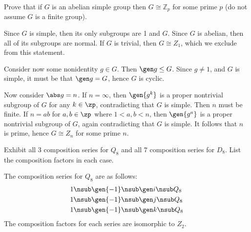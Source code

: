 \begin{problems}

    \item Prove that if $G$ is an abelian simple group then $G \cong \mathbb{Z}_p$ for some prime $p$ (do not assume $G$ is a finite group).
    \begin{sol}
        Since $G$ is simple, then its only subgroups are 1 and $G$. Since $G$ is abelian, then all of its subgroups are normal. If $G$ is trivial, then $G \cong Z_1$, which we exclude from this statement.
        
        Consider now some nonidentity $g \in G$. Then $\gen g \leq G$. Since $g \neq 1$, and $G$ is simple, it must be that $\gen g = G$, hence $G$ is cyclic.

        Now consider $\abs g = n$. If $n = \infty$, then $\gen{g^k}$ is a proper nontrivial subgroup of $G$ for any $k \in \zp$, contradicting that $G$ is simple. Then $n$ must be finite. If $n = ab$ for $a, b \in \zp$ where $1 < a, b < n$, then $\gen{g^a}$ is a proper nontrivial subgroup of $G$, again contradicting that $G$ is simple. It follows that $n$ is prime, hence $G \cong Z_n$ for some prime $n$.
    \end{sol}
    \item Exhibit all $3$ composition series for $Q_8$ and all $7$ composition series for $D_8$. List the composition factors in each case.
    \begin{sol}
        The composition series for $Q_8$ are as follows:
        \begin{align*}
            1 & \nsub \gen{-1} \nsub \gen i \nsub Q_8 \\
            1 & \nsub \gen{-1} \nsub \gen j \nsub Q_8 \\
            1 & \nsub \gen{-1} \nsub \gen k \nsub Q_8
        \end{align*}
        The composition factors for each series are isomorphic to $Z_2$.


\end{sol}
\end{problems}
